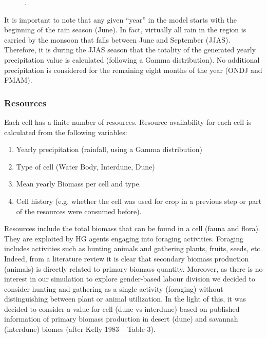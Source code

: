 \documentclass[11pt,oneside,a4paper,openright]{report}
\begin{document}
\begin{figure}[h!]
\centering
\setlength\fboxsep{0pt}
\setlength\fboxrule{0.5pt}
\caption{ .}
\label{fig:jamt_2}
\end{figure}


It is important to note that any given “year” in the model starts with the beginning of the rain season
(June). In fact, virtually all rain in the region is carried by the monsoon that falls between June and
September (JJAS). Therefore, it is during the JJAS season that the totality of the generated yearly
precipitation value is calculated (following a Gamma distribution). No additional precipitation is
considered for the remaining eight months of the year (ONDJ and FMAM).

\subsubsection{Resources}

Each cell has a finite number of resources. Resource availability for each cell is calculated from the
following variables:

\begin{enumerate}
\item Yearly precipitation (rainfall, using a Gamma distribution)
\item Type of cell (Water Body, Interdune, Dune)
\item Mean yearly Biomass per cell and type.
\item Cell history (e.g. whether the cell was used for crop in a previous step or part of the resources
were consumed before).
\end{enumerate}

Resources include the total biomass that can be found in a cell (fauna and flora). They are exploited
by HG agents engaging into foraging activities. Foraging includes activities such as hunting animals
and gathering plants, fruits, seeds, etc. Indeed, from a literature review it is clear that secondary
biomass production (animals) is directly related to primary biomass quantity. Moreover, as there is no
interest in our simulation to explore gender-based labour division we decided to consider hunting and
gathering as a single activity (foraging) without distinguishing between plant or animal utilization. In the
light of this, it was decided to consider a value for cell (dune vs interdune) based on published
information of primary biomass production in desert (dune) and savannah (interdune) biomes (after
Kelly 1983 – Table 3).
\end{document}
